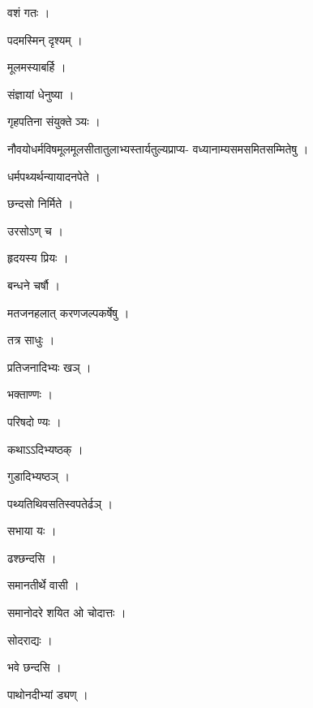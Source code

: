 \documentclass[10pt, openany]{book}
\begin{document}
\noindent वशं गतः ।

\noindent पदमस्मिन् दृश्यम् ।

\noindent मूलमस्याबर्हि ।

\noindent संज्ञायां धेनुष्या ।

\noindent गृहपतिना संयुक्ते ञ्यः ।

\noindent नौवयोधर्मविषमूलमूलसीतातुलाभ्यस्तार्यतुल्यप्राप्य- वध्यानाम्यसमसमितसम्मितेषु ।

\noindent धर्मपथ्यर्थन्यायादनपेते ।

\noindent छन्दसो निर्मिते ।

\noindent उरसोऽण् च ।

\noindent हृदयस्य प्रियः ।

\noindent बन्धने चर्षौ ।

\noindent मतजनहलात् करणजल्पकर्षेषु ।

\noindent तत्र साधुः ।

\noindent प्रतिजनादिभ्यः खञ् ।

\noindent भक्ताण्णः ।

\noindent परिषदो ण्यः ।

\noindent कथाऽऽदिभ्यष्ठक् ।

\noindent गुडादिभ्यष्ठञ् ।

\noindent पथ्यतिथिवसतिस्वपतेर्ढञ् ।

\noindent सभाया यः ।

\noindent ढश्छन्दसि ।

\noindent समानतीर्थे वासी ।

\noindent समानोदरे शयित ओ चोदात्तः ।

\noindent सोदराद्यः ।

\noindent भवे छन्दसि ।

\noindent पाथोनदीभ्यां ड्यण् ।
\end{document}
